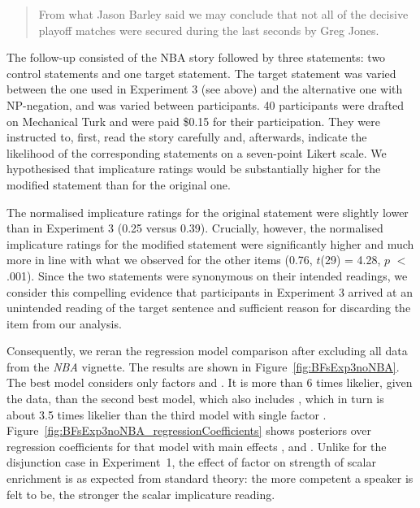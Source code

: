 \documentclass[12pt]{article}
\begin{document}
\begin{quote} From what Jason Barley said we may conclude that not all of the decisive playoff matches were secured during the last seconds by Greg Jones. \end{quote}

\noindent The follow-up consisted of the NBA story followed by three statements: two control
statements and one target statement. The target statement was varied between the one used in
Experiment 3 (see above) and the alternative one with NP-negation, and was varied between
participants. 40 participants were drafted on Mechanical Turk and were paid \$0.15 for their
participation. They were instructed to, first, read the story carefully and, afterwards,
indicate the likelihood of the corresponding statements on a seven-point Likert scale. We
hypothesised that implicature ratings would be substantially higher for the modified statement
than for the original one.

The normalised implicature ratings for the original statement were slightly lower than in
Experiment 3 (0.25 versus 0.39). Crucially, however, the normalised implicature ratings for the
modified statement were significantly higher and much more in line with what we observed for
the other items (0.76, $t$(29) = 4.28, $p$ $<$ .001). Since the two statements were synonymous
on their intended readings, we consider this compelling evidence that participants in
Experiment 3 arrived at an unintended reading of the target sentence and sufficient reason for
discarding the item from our analysis.

Consequently, we reran the regression model comparison after excluding all data from the
\emph{NBA} vignette. The results are shown in Figure~\ref{fig:BFsExp3noNBA}. The best model
considers only factors \com and \pri. It is more than 6 times likelier, given the data, than
the second best model, which also includes \rel, which in turn is about 3.5 times likelier than
the third model with single factor \pri. Figure~\ref{fig:BFsExp3noNBA_regressionCoefficients}
shows posteriors over regression coefficients for that model with main effects \rel, \com and
\pri. Unlike for the disjunction case in Experiment~1, the effect of factor \com on strength of
scalar enrichment is as expected from standard theory: the more competent a speaker is felt to
be, the stronger the scalar implicature reading.
\end{document}
